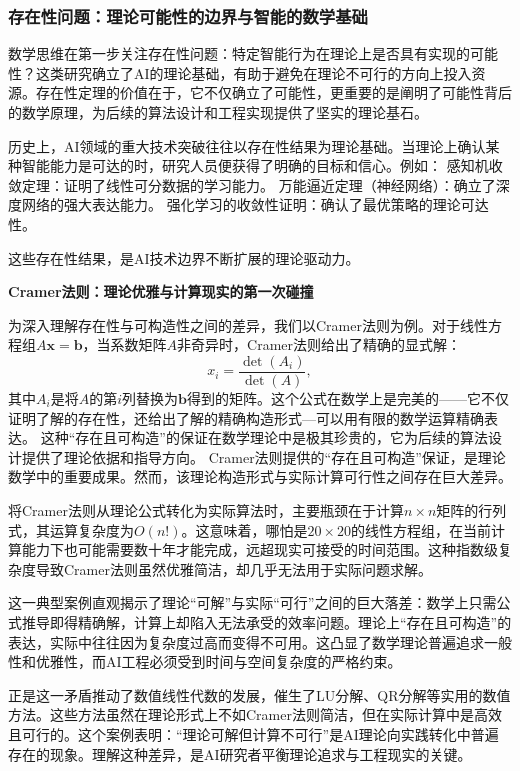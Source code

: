 \subsubsection{存在性问题：理论可能性的边界与智能的数学基础}

数学思维在第一步关注存在性问题：特定智能行为在理论上是否具有实现的可能性？这类研究确立了AI的理论基础，有助于避免在理论不可行的方向上投入资源。存在性定理的价值在于，它不仅确立了可能性，更重要的是阐明了可能性背后的数学原理，为后续的算法设计和工程实现提供了坚实的理论基石。

历史上，AI领域的重大技术突破往往以存在性结果为理论基础。当理论上确认某种智能能力是可达的时，研究人员便获得了明确的目标和信心。例如：
感知机收敛定理：证明了线性可分数据的学习能力。
万能逼近定理（神经网络）：确立了深度网络的强大表达能力。
强化学习的收敛性证明：确认了最优策略的理论可达性。

这些存在性结果，是AI技术边界不断扩展的理论驱动力。

\textbf{Cramer法则：理论优雅与计算现实的第一次碰撞}

为深入理解存在性与可构造性之间的差异，我们以Cramer法则为例。对于线性方程组$A\mathbf{x} = \mathbf{b}$，当系数矩阵$A$非奇异时，Cramer法则给出了精确的显式解：
$$x_i = \frac{\det(A_i)}{\det(A)},$$
其中$A_i$是将$A$的第$i$列替换为$\mathbf{b}$得到的矩阵。这个公式在数学上是完美的——它不仅证明了解的存在性，还给出了解的精确构造形式---可以用有限的数学运算精确表达。
这种``存在且可构造''的保证在数学理论中是极其珍贵的，它为后续的算法设计提供了理论依据和指导方向。
Cramer法则提供的``存在且可构造''保证，是理论数学中的重要成果。然而，该理论构造形式与实际计算可行性之间存在巨大差异。

将Cramer法则从理论公式转化为实际算法时，主要瓶颈在于计算$n \times n$矩阵的行列式，其运算复杂度为$O(n!)$。这意味着，哪怕是$20 \times 20$的线性方程组，在当前计算能力下也可能需要数十年才能完成，远超现实可接受的时间范围。这种指数级复杂度导致Cramer法则虽然优雅简洁，却几乎无法用于实际问题求解。

这一典型案例直观揭示了理论“可解”与实际“可行”之间的巨大落差：数学上只需公式推导即得精确解，计算上却陷入无法承受的效率问题。理论上“存在且可构造”的表达，实际中往往因为复杂度过高而变得不可用。这凸显了数学理论普遍追求一般性和优雅性，而AI工程必须受到时间与空间复杂度的严格约束。

正是这一矛盾推动了数值线性代数的发展，催生了LU分解、QR分解等实用的数值方法。这些方法虽然在理论形式上不如Cramer法则简洁，但在实际计算中是高效且可行的。这个案例表明：``理论可解但计算不可行''是AI理论向实践转化中普遍存在的现象。理解这种差异，是AI研究者平衡理论追求与工程现实的关键。

